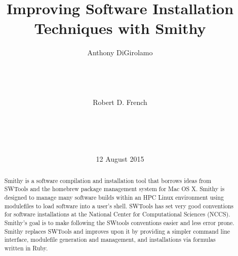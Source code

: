 \documentclass{acm_proc_article-sp}
\begin{document}
\title{Improving Software Installation Techniques with Smithy}


%
\author{
\alignauthor
Anthony DiGirolamo\\ %
       \\
       \\
       \\
       \\
\alignauthor
Robert D. French\\ %
       \\
       \\
       \\
       \\
}

\date{12 August 2015}

\maketitle

\begin{abstract}

Smithy is a software compilation and installation tool that borrows ideas from
SWTools\cite{swtools} and the homebrew\cite{homebrew} package management system
for Mac OS X.  Smithy is designed to manage many software builds within an HPC
Linux environment using modulefiles to load software into a user's shell.
SWTools has set very good conventions for software installations at the National
Center for Computational Sciences (NCCS).
Smithy's goal is to make following the SWtools conventions easier and less error
prone.  Smithy replaces SWTools and improves upon it by providing a simpler
command line interface, modulefile generation and management, and installations
via formulas written in Ruby.

\end{abstract}
\end{document}
